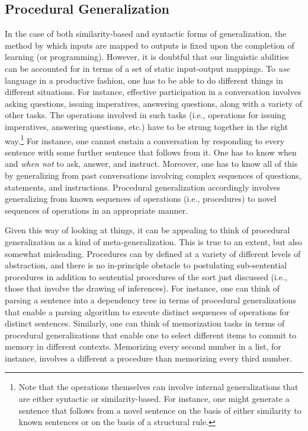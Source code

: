 \subsection{Procedural Generalization}

In the case of both similarity-based and syntactic forms of generalization, the method by which inputs are mapped to outputs is fixed upon the completion of learning (or programming). However, it is doubtful that our linguistic abilities can be accounted for in terms of a set of static input-output mappings. To \textit{use} language in a productive fashion, one has to be able to do different things in different situations. For instance, effective participation in a conversation involves asking questions, issuing imperatives, answering questions, along with a variety of other tasks. The operations involved in such tasks (i.e., operations for issuing imperatives, answering questions, etc.) have to be strung together in the right way.\footnote{Note that the operations themselves can involve internal generalizations that are either syntactic or similarity-based. For instance, one might generate a sentence that follows from a novel sentence on the basis of either similarity to known sentences or on the basis of a structural rule.} For instance, one cannot sustain a conversation by responding to every sentence with some further sentence that follows from it. One has to know when and \textit{when not} to ask, answer, and instruct. Moreover, one has to know all of this by generalizing from past conversations involving complex sequences of questions, statements, and instructions. Procedural generalization accordingly involves generalizing from known sequences of operations (i.e., procedures) to novel sequences of operations in an appropriate manner.
 
Given this way of looking at things, it can be appealing to think of procedural generalization as a kind of meta-generalization. This is true to an extent, but also somewhat misleading. Procedures can by defined at a variety of different levels of abstraction, and there is no in-principle obstacle to postulating sub-sentential procedures in addition to sentential procedures of the sort just discussed (i.e., those that involve the drawing of inferences). For instance, one can think of parsing a sentence into a dependency tree in terms of procedural generalizations that enable a parsing algorithm to execute distinct sequences of operations for distinct sentences. Similarly, one can think of memorization tasks in terms of procedural generalizations that enable one to select different items to commit to memory in different contexts. Memorizing every second number in a list, for instance, involves a different a procedure than memorizing every third number.

